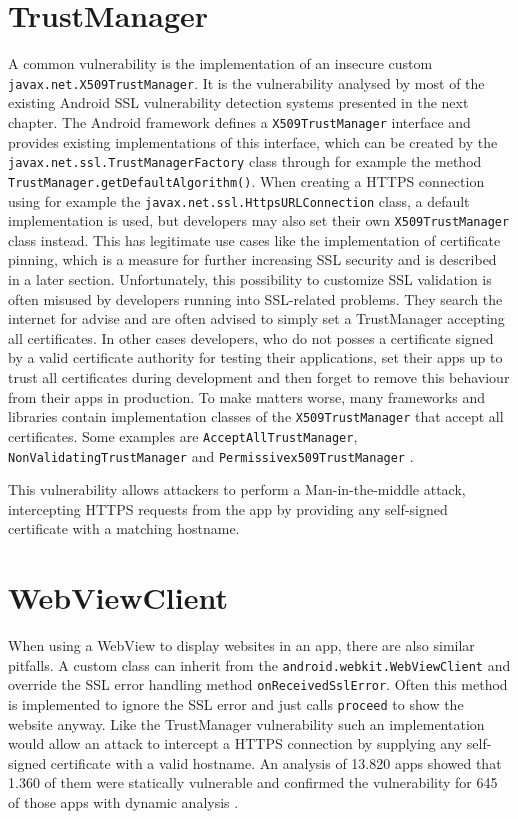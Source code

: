 \documentclass[draft,final]{vutinfth} %
\begin{document}
\section*{TrustManager}

A common vulnerability is the implementation of an insecure custom \texttt{javax.net.X509\-TrustManager}. It is the vulnerability analysed by most of the existing Android SSL vulnerability detection systems presented in the next chapter. The Android framework defines a \texttt{X509TrustManager} interface and provides existing implementations of this interface, which can be created by the \texttt{javax.net.ssl.TrustManagerFactory} class through for example the method \texttt{TrustManager.getDefaultAlgorithm()}. When creating a HTTPS connection using for example the \texttt{javax.net.ssl.HttpsURLConnection} class, a default implementation is used, but developers may also set their own \texttt{X509Trust\-Manager} class instead. This has legitimate use cases like the implementation of certificate pinning, which is a measure for further increasing SSL security and is described in a later section. Unfortunately, this possibility to customize SSL validation is often misused by developers running into SSL-related problems. They search the internet for advise and are often advised to simply set a TrustManager accepting all certificates. In other cases developers, who do not posses a certificate signed by a valid certificate authority for testing their applications, set their apps up to trust all certificates during development and then forget to remove this behaviour from their apps in production.
To make matters worse, many frameworks and libraries contain implementation classes of the \texttt{X509TrustManager} that accept all certificates. Some examples are \texttt{AcceptAllTrustManager}, \texttt{NonValidatingTrustManager} and \texttt{Permissivex509TrustManager} \cite{Fahl2012}.

This vulnerability allows attackers to perform a Man-in-the-middle attack, intercepting HTTPS requests from the app by providing any self-signed certificate with a matching hostname.

\section*{WebViewClient}

When using a WebView to display websites in an app, there are also similar pitfalls. A custom class can inherit from the \texttt{android.webkit.WebViewClient} and override the SSL error handling method \texttt{onReceivedSslError}. Often this method is implemented to ignore the SSL error and just calls \texttt{proceed} to show the website anyway. Like the TrustManager vulnerability such an implementation would allow an attack to intercept a HTTPS connection by supplying any self-signed certificate with a valid hostname. An analysis of 13.820 apps showed that 1.360 of them were statically vulnerable and confirmed the vulnerability for 645 of those apps with dynamic analysis \cite{Zuo}. 
\end{document}
